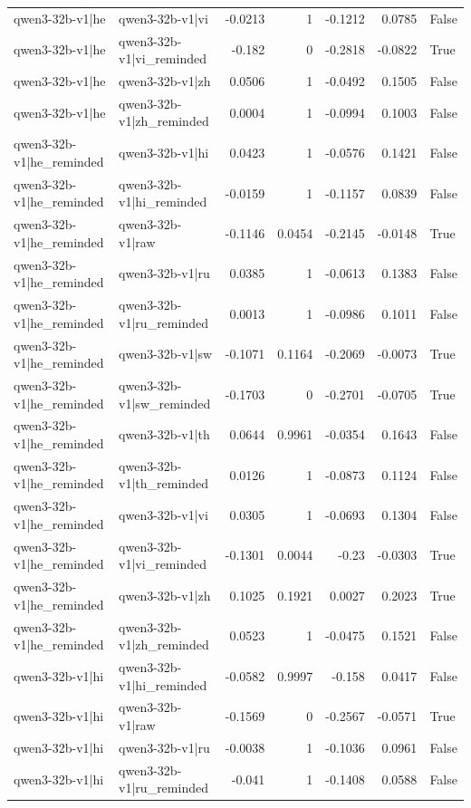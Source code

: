 \begin{table}
\begin{tabular}{l l r r r r l}
qwen3-32b-v1|he & qwen3-32b-v1|vi & -0.0213 & 1 & -0.1212 & 0.0785 & False \\
qwen3-32b-v1|he & qwen3-32b-v1|vi_reminded & -0.182 & 0 & -0.2818 & -0.0822 & True \\
qwen3-32b-v1|he & qwen3-32b-v1|zh & 0.0506 & 1 & -0.0492 & 0.1505 & False \\
qwen3-32b-v1|he & qwen3-32b-v1|zh_reminded & 0.0004 & 1 & -0.0994 & 0.1003 & False \\
qwen3-32b-v1|he_reminded & qwen3-32b-v1|hi & 0.0423 & 1 & -0.0576 & 0.1421 & False \\
qwen3-32b-v1|he_reminded & qwen3-32b-v1|hi_reminded & -0.0159 & 1 & -0.1157 & 0.0839 & False \\
qwen3-32b-v1|he_reminded & qwen3-32b-v1|raw & -0.1146 & 0.0454 & -0.2145 & -0.0148 & True \\
qwen3-32b-v1|he_reminded & qwen3-32b-v1|ru & 0.0385 & 1 & -0.0613 & 0.1383 & False \\
qwen3-32b-v1|he_reminded & qwen3-32b-v1|ru_reminded & 0.0013 & 1 & -0.0986 & 0.1011 & False \\
qwen3-32b-v1|he_reminded & qwen3-32b-v1|sw & -0.1071 & 0.1164 & -0.2069 & -0.0073 & True \\
qwen3-32b-v1|he_reminded & qwen3-32b-v1|sw_reminded & -0.1703 & 0 & -0.2701 & -0.0705 & True \\
qwen3-32b-v1|he_reminded & qwen3-32b-v1|th & 0.0644 & 0.9961 & -0.0354 & 0.1643 & False \\
qwen3-32b-v1|he_reminded & qwen3-32b-v1|th_reminded & 0.0126 & 1 & -0.0873 & 0.1124 & False \\
qwen3-32b-v1|he_reminded & qwen3-32b-v1|vi & 0.0305 & 1 & -0.0693 & 0.1304 & False \\
qwen3-32b-v1|he_reminded & qwen3-32b-v1|vi_reminded & -0.1301 & 0.0044 & -0.23 & -0.0303 & True \\
qwen3-32b-v1|he_reminded & qwen3-32b-v1|zh & 0.1025 & 0.1921 & 0.0027 & 0.2023 & True \\
qwen3-32b-v1|he_reminded & qwen3-32b-v1|zh_reminded & 0.0523 & 1 & -0.0475 & 0.1521 & False \\
qwen3-32b-v1|hi & qwen3-32b-v1|hi_reminded & -0.0582 & 0.9997 & -0.158 & 0.0417 & False \\
qwen3-32b-v1|hi & qwen3-32b-v1|raw & -0.1569 & 0 & -0.2567 & -0.0571 & True \\
qwen3-32b-v1|hi & qwen3-32b-v1|ru & -0.0038 & 1 & -0.1036 & 0.0961 & False \\
qwen3-32b-v1|hi & qwen3-32b-v1|ru_reminded & -0.041 & 1 & -0.1408 & 0.0588 & False \\

\end{tabular}
\end{table}
